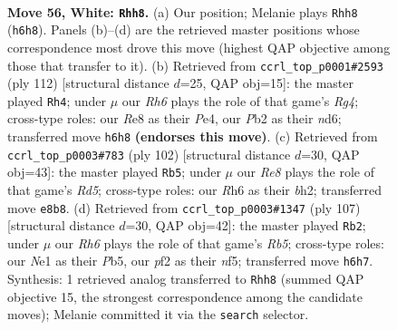 \documentclass[11pt]{article}
\begin{document}
\clearpage

\begin{figure}[p]\centering
\begin{subfigure}{0.46\textwidth}\centering
\resizebox{\linewidth}{!}{%
\newchessgame
\chessboard[
  setfen={4R3/5k2/7R/2p4P/8/8/1P3p2/3KN2r w - - 13 56},
  showmover=false,
  pgfstyle=straightmove, color=movearrow, markmove={h6-h8}
]}
\caption{}
\end{subfigure}\hfill
\begin{subfigure}{0.46\textwidth}\centering
\resizebox{\linewidth}{!}{%
\newchessgame
\chessboard[
  setfen={8/7k/3n3P/4p3/4P1R1/r4NK1/8/8 w - - 1 57},
  showmover=false,
  pgfstyle=straightmove, color=movearrow, markmove={g4-h4}
]}
\caption{}
\end{subfigure}
\\[4pt]
\begin{subfigure}{0.46\textwidth}\centering
\resizebox{\linewidth}{!}{%
\newchessgame
\chessboard[
  setfen={8/6p1/4k2p/3R3P/4P3/r2NK3/7b/8 w - - 3 52},
  showmover=false,
  pgfstyle=straightmove, color=movearrow, markmove={d5-b5}
]}
\caption{}
\end{subfigure}\hfill
\begin{subfigure}{0.46\textwidth}\centering
\resizebox{\linewidth}{!}{%
\newchessgame
\chessboard[
  setfen={8/8/1R2nk2/1p2pN2/1r2P3/3K4/8/8 b - - 1 54},
  showmover=false,
  pgfstyle=straightmove, color=movearrow, markmove={b4-b2}
]}
\caption{}
\end{subfigure}
\caption{\textbf{Move 56, White: \texttt{Rhh8}.} (a) Our position; Melanie plays \texttt{Rhh8} (\texttt{h6h8}). Panels (b)--(d) are the retrieved master positions whose correspondence most drove this move (highest QAP objective among those that transfer to it). (b) Retrieved from \texttt{ccrl\_top\_p0001\#2593} (ply 112) [structural distance $d$=25, QAP obj=15]: the master played \texttt{Rh4}; under $\mu$ our \emph{Rh6} plays the role of that game's \emph{Rg4}; cross-type roles: our \emph{R}e8 as their \emph{P}e4, our \emph{P}b2 as their \emph{n}d6; transferred move \texttt{h6h8} \textbf{(endorses this move)}. (c) Retrieved from \texttt{ccrl\_top\_p0003\#783} (ply 102) [structural distance $d$=30, QAP obj=43]: the master played \texttt{Rb5}; under $\mu$ our \emph{Re8} plays the role of that game's \emph{Rd5}; cross-type roles: our \emph{R}h6 as their \emph{b}h2; transferred move \texttt{e8b8}. (d) Retrieved from \texttt{ccrl\_top\_p0003\#1347} (ply 107) [structural distance $d$=30, QAP obj=42]: the master played \texttt{Rb2}; under $\mu$ our \emph{Rh6} plays the role of that game's \emph{Rb5}; cross-type roles: our \emph{N}e1 as their \emph{P}b5, our \emph{p}f2 as their \emph{n}f5; transferred move \texttt{h6h7}. Synthesis: 1 retrieved analog transferred to \texttt{Rhh8} (summed QAP objective 15, the strongest correspondence among the candidate moves); Melanie committed it via the \texttt{search} selector.}
\label{fig:thought-m110}
\end{figure}
\end{document}
